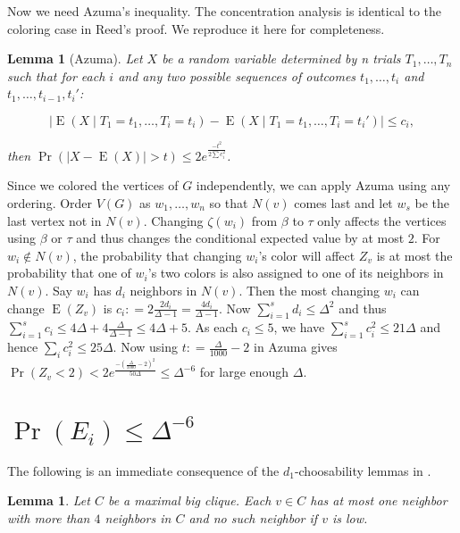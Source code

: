 \documentclass[12pt]{amsart}
\theoremstyle{plain}
\newtheorem{lem}[thm]{Lemma}
\theoremstyle{definition}
\theoremstyle{remark}
\newcommand{\card}[1]{\left|#1\right|}
\newcommand{\DefinedAs}{\mathrel{\mathop:}=}
\newcommand{\ex}{\operatorname{E}}
\begin{document}
Now we need Azuma's inequality.  The concentration analysis is
identical to the coloring case in Reed's proof.  We reproduce it here for
completeness.

\begin{lem}[Azuma]
Let $X$ be a random variable determined by n trials $T_1, \ldots, T_n$ such that
for each $i$ and any two possible sequences of outcomes $t_1, \ldots, t_i$ and
$t_1, \ldots, t_{i-1}, t_i'$:

\[\card{\ex(X \mid T_1 = t_1, \ldots, T_i = t_i) - \ex(X \mid T_1 = t_1,
\ldots, T_i = t_i')} \leq c_i,\]

\noindent then $\Pr(\card{X - \ex(X)} > t) \leq 2e^{\frac{-t^2}{2\sum c_i^2}}$.
\end{lem}

Since we colored the vertices of $G$ independently, we can apply Azuma using any
ordering.  Order $V(G)$ as $w_1, \ldots, w_n$ so that $N(v)$ comes last and let
$w_s$ be the last vertex not in $N(v)$.  Changing $\zeta(w_i)$ from $\beta$ to
$\tau$ only affects the vertices using $\beta$ or $\tau$ and thus changes the
conditional expected value by at most $2$.  For $w_i \not \in N(v)$, the
probability that changing $w_i$'s color will affect $Z_v$ is at most the probability that one of
$w_i$'s two colors is also assigned to one of its neighbors in $N(v)$.  Say
$w_i$ has $d_i$ neighbors in $N(v)$.  Then the most changing $w_i$ can change
$\ex(Z_v)$ is $c_i \DefinedAs 2\frac{2d_i}{\Delta-1} = \frac{4d_i}{\Delta-1}$. 
Now $\sum_{i=1}^s d_i \leq \Delta^2$ and thus $\sum_{i=1}^s c_i \leq 4\Delta + 4
\frac{\Delta}{\Delta-1} \leq 4\Delta + 5$.  As each $c_i \leq 5$, we have
$\sum_{i=1}^s c_i^2 \leq 21\Delta$ and hence $\sum_i c_i^2 \leq 25\Delta$.  Now
using $t \DefinedAs \frac{\Delta}{1000} - 2$ in Azuma gives $\Pr(Z_v < 2) <
2e^{\frac{-(\frac{\Delta}{1000} - 2)^2}{50\Delta}} \leq \Delta^{-6}$ for large
enough $\Delta$.

\section{$\Pr(E_i) \leq \Delta^{-6}$}
The following is an immediate consequence of the $d_1$-choosability lemmas in
\cite{mules}.

\begin{lem}\label{AtMostFourIn}
Let $C$ be a maximal big clique.  Each $v \in C$ has at most one neighbor with
more than $4$ neighbors in $C$ and no such neighbor if $v$ is low.
\end{lem}
\end{document}
